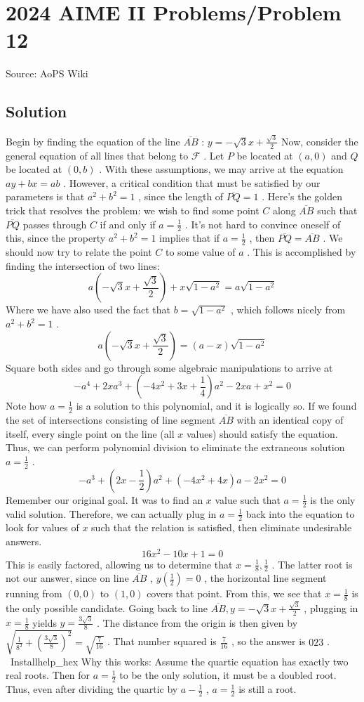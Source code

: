 \documentclass[12pt]{article}
\begin{document}
\section*{{2024 AIME II Problems/Problem 12}}
Source: AoPS Wiki

\subsection*{Solution}
Begin by finding the equation of the line $\overline{AB}$ : $y= -\sqrt{3}x+\frac{\sqrt{3}}{2}$ Now, consider the general equation of all lines that belong to $\mathcal{F}$ . Let $P$ be located at $(a,0)$ and $Q$ be located at $(0,b)$ . With these assumptions, we may arrive at the equation $ay +bx =ab$ . However, a critical condition that must be satisfied by our parameters is that $a^2+b^2=1$ , since the length of $\overline{PQ}=1$ . Here's the golden trick that resolves the problem: we wish to find some point $C$ along $\overline{AB}$ such that $\overline{PQ}$ passes through $C$ if and only if $a=\frac{1}{2}$ . It's not hard to convince oneself of this, since the property $a^2+b^2=1$ implies that if $a=\frac{1}{2}$ , then $\overline{PQ}=\overline{AB}$ . We should now try to relate the point $C$ to some value of $a$ . This is accomplished by finding the intersection of two lines: \[ a\left(-\sqrt{3}x +\frac{\sqrt{3}}{2}\right) + x\sqrt{1-a^2} = a\sqrt{1-a^2} \] Where we have also used the fact that $b=\sqrt{1-a^2}$ , which follows nicely from $a^2+b^2 =1$ . \[ a\left(-\sqrt{3}x +\frac{\sqrt{3}}{2}\right) = (a-x)\sqrt{1-a^2} \] Square both sides and go through some algebraic manipulations to arrive at \[ -a^4 +2xa^3+\left(-4x^2+3x+\frac{1}{4}\right)a^2-2xa+x^2=0 \] Note how $a=\frac{1}{2}$ is a solution to this polynomial, and it is logically so. If we found the set of intersections consisting of line segment $\overline{AB}$ with an identical copy of itself, every single point on the line (all $x$ values) should satisfy the equation. Thus, we can perform polynomial division to eliminate the extraneous solution $a=\frac{1}{2}$ . \[ -a^3 + \left(2x-\frac{1}{2}\right)a^2+(-4x^2+4x)a-2x^2=0 \] Remember our original goal. It was to find an $x$ value such that $a=\frac{1}{2}$ is the only valid solution. Therefore, we can actually plug in $a=\frac{1}{2}$ back into the equation to look for values of $x$ such that the relation is satisfied, then eliminate undesirable answers. \[ 16x^2-10x+1=0 \] This is easily factored, allowing us to determine that $x=\frac{1}{8},\frac{1}{2}$ . The latter root is not our answer, since on line $\overline{AB}$ , $y\left(\frac{1}{2}\right)=0$ , the horizontal line segment running from $(0,0)$ to $(1,0)$ covers that point. From this, we see that $x=\frac{1}{8}$ is the only possible candidate. Going back to line $\overline{AB}, y= -\sqrt{3}x+\frac{\sqrt{3}}{2}$ , plugging in $x=\frac{1}{8}$ yields $y=\frac{3\sqrt{3}}{8}$ . The distance from the origin is then given by $\sqrt{\frac{1}{8^2}+\left(\frac{3\sqrt{3}}{8}\right)^2} =\sqrt{\frac{7}{16}}$ . That number squared is $\frac{7}{16}$ , so the answer is $\boxed{023}$ . ~Installhelp_hex Why this works: Assume the quartic equation has exactly two real roots. Then for $a=\frac{1}{2}$ to be the only solution, it must be a doubled root. Thus, even after dividing the quartic by $a-\frac{1}{2}$ , $a=\frac{1}{2}$ is still a root.
\end{document}

